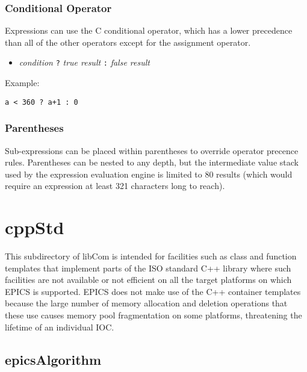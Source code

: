 \subsubsection{Conditional Operator}

Expressions can use the C conditional operator, which has a lower precedence than all of the other operators except for the 
assignment operator.

\begin{itemize}
\item \emph{condition} \verb|?| \emph{true result} \verb|:| \emph{false result}

\end{itemize}

Example:

\begin{verbatim}
a < 360 ? a+1 : 0
\end{verbatim}

\subsubsection{Parentheses}

Sub-expressions can be placed within parentheses to override operator precence rules. Parentheses can be nested to any 
depth, but the intermediate value stack used by the expression evaluation engine is limited to 80 results (which would 
require an expression at least 321 characters long to reach).

\section{cppStd}

This subdirectory of libCom is intended for facilities such as class and function templates that implement parts of the ISO 
standard C++ library where such facilities are not available or not efficient on all the target platforms on which EPICS is 
supported. EPICS does not make use of the C++ container templates because the large number of memory allocation and 
deletion operations that these use causes memory pool fragmentation on some platforms, threatening the lifetime of an 
individual IOC.

\subsection{epicsAlgorithm}

